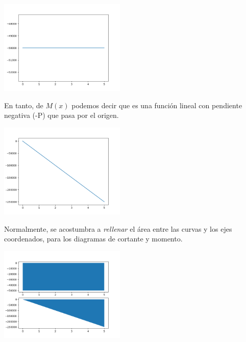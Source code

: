 \documentclass[12pt,letterpaper]{article}
\begin{document}
\begin{center}
\includegraphics[width=0.45\textwidth]{code/shear.PNG}
\end{center}

En tanto, de $M(x)$ podemos decir que es una función lineal con pendiente negativa (-P) que pasa por 
el origen.

\begin{center}
\includegraphics[width=0.45\textwidth]{code/moment.PNG}
\end{center}

Normalmente, se acostumbra a \textit{rellenar} el área entre las curvas y los ejes coordenados, para 
los diagramas de cortante y momento.

\begin{center}
\includegraphics[width=0.45\textwidth]{code/shear_moment.PNG}
\end{center}
\end{document}
